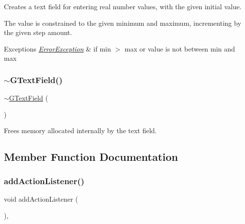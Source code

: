 Creates a text field for entering real number values, with the given initial value. 

The value is constrained to the given minimum and maximum, incrementing by the given step amount. 
\begin{DoxyExceptions}{Exceptions}
{\em \mbox{\hyperlink{classErrorException}{Error\+Exception}}} & if min $>$ max or value is not between min and max \\
\hline
\end{DoxyExceptions}
\mbox{\label{classGTextField_a5f71a42054388fb9dc24da9d8322ccdd}} 
\subsubsection{\texorpdfstring{$\sim$\+G\+Text\+Field()}{~GTextField()}}
{\footnotesize\ttfamily $\sim$\mbox{\hyperlink{classGTextField}{G\+Text\+Field}} (\begin{DoxyParamCaption}{ }\end{DoxyParamCaption})\hspace{0.3cm}{\ttfamily [virtual]}}



Frees memory allocated internally by the text field. 



\subsection{Member Function Documentation}
\mbox{\label{classGInteractor_a02f20ea6edfa0671f31c4c648a253833}} 
\subsubsection{\texorpdfstring{add\+Action\+Listener()}{addActionListener()}}
{\footnotesize\ttfamily void add\+Action\+Listener (\begin{DoxyParamCaption}{ }\end{DoxyParamCaption})\hspace{0.3cm}{\ttfamily [virtual]}, {\ttfamily [inherited]}}



